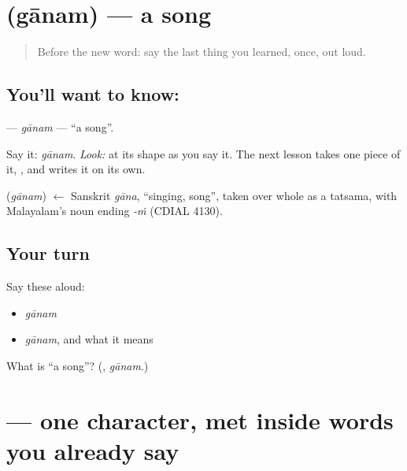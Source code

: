 \section[\texorpdfstring{\ml{ഗാനം} (gānam)}{ഗാനം (gānam)}]{ (gānam) — a song}

\label{lesson:ML-C39-gaanam}



\begin{quote}
Before the new word: say the last thing you learned, once, out loud.
\end{quote}

\subsection*{You'll want to know: }
\textbf{} — \emph{gānam} — \textquotedblleft{}a song\textquotedblright{}.

Say it: \emph{gānam}. \emph{Look:} at its shape as you say it. The next lesson takes one piece of it, \textbf{}, and writes it on its own.

\begin{cousinweb}
\textbf{} (\emph{gānam}) $\leftarrow$ Sanskrit \emph{gāna}, \textquotedblleft{}singing, song\textquotedblright{}, taken over whole as a tatsama, with Malayalam's noun ending \emph{-ṁ} (CDIAL 4130).
\end{cousinweb}

\subsection*{Your turn}
Say these aloud:

\begin{itemize}
\raggedright
  \item \emph{gānam}
  \item \emph{gānam}, and what it means
\end{itemize}

\begin{tcolorbox}[breakable,colback=teal!4,colframe=teal!35!black,title={Before you move on}]
What is \textquotedblleft{}a song\textquotedblright{}? (\textbf{}, \emph{gānam}.)
\end{tcolorbox}
\section[\texorpdfstring{\ml{ഗ} (ga)}{ഗ (ga)}]{ — one character, met inside words you already say}

